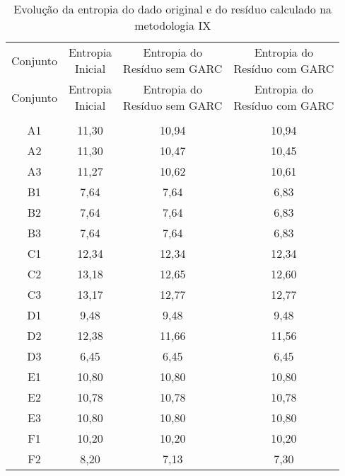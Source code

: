 \begin{center}
\begin{longtable}{cccc}
\toprule
\rowcolor{white}
\caption[Metodologia IX: evolução da entropia]{Evolução da entropia do dado
original e do resíduo calculado na metodologia IX}
\label{tab:EvolucaoEntropiaMet9}\\
\midrule
Conjunto & \specialcell{Entropia \\Inicial} & \specialcell{Entropia do
\\Resíduo sem GARC} & \specialcell{Entropia do
\\Resíduo com GARC}  \\
\midrule
\endfirsthead
\midrule
\rowcolor{white}
Conjunto & \specialcell{Entropia \\Inicial} & \specialcell{Entropia do
\\Resíduo sem GARC} & \specialcell{Entropia do
\\Resíduo com GARC}  \\
\toprule
\endhead
\midrule \\ %
\endfoot
\bottomrule 
\endlastfoot
    A1    & 11,30 & 10,94 & 10,94 \\
    A2    & 11,30 & 10,47 & 10,45 \\
    A3    & 11,27 & 10,62 & 10,61 \\
    B1    & 7,64  & 7,64  & 6,83 \\
    B2    & 7,64  & 7,64  & 6,83 \\
    B3    & 7,64  & 7,64  & 6,83 \\
    C1    & 12,34 & 12,34 & 12,34 \\
    C2    & 13,18 & 12,65 & 12,60 \\
    C3    & 13,17 & 12,77 & 12,77 \\
    D1    & 9,48  & 9,48  & 9,48 \\
    D2    & 12,38 & 11,66 & 11,56 \\
    D3    & 6,45  & 6,45  & 6,45 \\
    E1    & 10,80 & 10,80 & 10,80 \\
    E2    & 10,78 & 10,78 & 10,78 \\
    E3    & 10,80 & 10,80 & 10,80 \\
    F1    & 10,20 & 10,20 & 10,20 \\
    F2    & 8,20  & 7,13  & 7,30 \\

\end{longtable}
\end{center}
